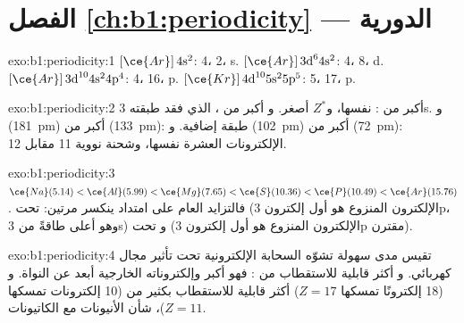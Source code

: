 \section*{الفصل \ref{ch:b1:periodicity} --- الدورية}

\begin{solution}{exo:b1:periodicity:1}
 $[\ce{Ar}]\,4\text{s}^2$:  4،  2،  s. 
$[\ce{Ar}]\,3\text{d}^6 4\text{s}^2$:  4،  8،  d. 
$[\ce{Ar}]\,3\text{d}^{10} 4\text{s}^2 4\text{p}^4$:  4،  16، 
p.  $[\ce{Kr}]\,4\text{d}^{10} 5\text{s}^2 5\text{p}^5$:  5،
 17،  p.
\end{solution}

\begin{solution}{exo:b1:periodicity:2}
 أكبر من :  نفسها، و$Z^{*}$ أصغر. و
أكبر من ، الذي فقد طبقته 3s. و
(\qty{181}{pm}) أكبر من  (\qty{133}{pm}): طبقة إضافية.
و (\qty{102}{pm}) أكبر من  (\qty{72}{pm}): الإلكترونات
العشرة نفسها، وشحنة نووية 11 مقابل 12.
\end{solution}

\begin{solution}{exo:b1:periodicity:3}
$\ce{Na} (5.14) < \ce{Al} (5.99) < \ce{Mg} (7.65) < \ce{S} (10.36) <
\ce{P} (10.49) < \ce{Ar} (15.76)$. فالتزايد العام على امتداد 
ينكسر مرتين:  تحت  (الإلكترون المنزوع هو أول إلكترون
3p، وهو أعلى طاقةً من 3s) و تحت  (الإلكترون
المنزوع هو أول إلكترون 3p مقترن).
\end{solution}

\begin{solution}{exo:b1:periodicity:4}
تقيس  مدى سهولة تشوّه السحابة الإلكترونية تحت تأثير
مجال كهربائي. و أكثر قابلية للاستقطاب من : فهو أكبر
وإلكتروناته الخارجية أبعد عن النواة. و (18
إلكترونًا تمسكها $Z = 17$) أكثر قابلية للاستقطاب بكثير من  (10
إلكترونات تمسكها $Z = 11$)، شأن الأنيونات مع الكاتيونات.
\end{solution}

